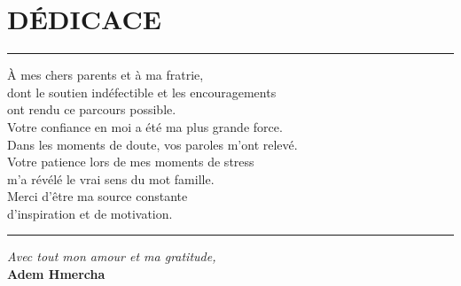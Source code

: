 \chapter*{DÉDICACE}
\thispagestyle{fancy}

\vspace*{2cm}

\begin{center}
  {\noindent\rule{0.55\textwidth}{1.2pt}}
\end{center}

\vspace{0.8cm}

\begin{center}
  \begin{minipage}{0.72\textwidth}
    \centering
    \large
    À mes chers parents et à ma fratrie,\\[0.4cm]
    dont le soutien indéfectible et les encouragements\\
    ont rendu ce parcours possible.\\[0.6cm]
    Votre confiance en moi a été ma plus grande force.\\[0.4cm]
    Dans les moments de doute, vos paroles m'ont relevé.\\[0.4cm]
    Votre patience lors de mes moments de stress\\
    m'a révélé le vrai sens du mot famille.\\[0.6cm]
    Merci d'être ma source constante\\
    d'inspiration et de motivation.
  \end{minipage}
\end{center}

\vspace{0.8cm}

\begin{center}
  {\noindent\rule{0.55\textwidth}{1.2pt}}
\end{center}

\vspace{1.2cm}

\begin{flushright}
  \textit{Avec tout mon amour et ma gratitude,}\\[0.3cm]
  \textbf{Adem Hmercha}
\end{flushright}
